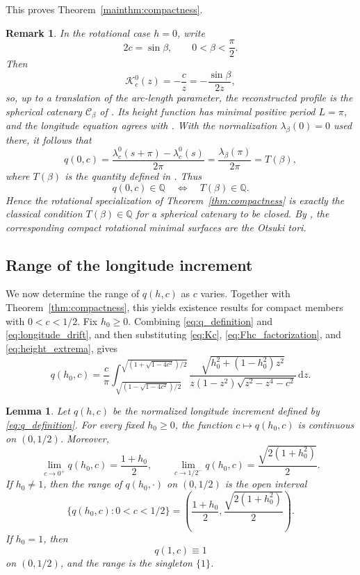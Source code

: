\documentclass[a4paper,11pt]{amsart}
\numberwithin{equation}{section}
\theoremstyle{plain}
\newtheorem{lem}[thm]{Lemma}
\newtheorem{rem}[thm]{Remark}
\newcommand{\dif}{\mathrm{d}}
\begin{document}
This proves Theorem~\ref{mainthm:compactness}.

\begin{rem}
In the rotational case $h=0$, write
\[
2c=\sin\beta,
\qquad
0<\beta<\frac{\pi}{2}.
\]
Then
\[
\mathcal K_c^0(z)=-\frac{c}{z}
=-\frac{\sin\beta}{2z},
\]
so, up to a translation of the arc-length parameter, the reconstructed
profile is the spherical catenary $\mathcal C_\beta$ of
\cite[Section~3.2]{Castro2024}. Its height function has minimal positive
period $L=\pi$, and the longitude equation agrees with
\cite[Eqs.~(3.12)--(3.14)]{Castro2024}. With the normalization
$\lambda_\beta(0)=0$ used there, it follows that
\[
q(0,c)
=
\frac{\lambda_c^0(s+\pi)-\lambda_c^0(s)}{2\pi}
=
\frac{\lambda_\beta(\pi)}{2\pi}
= T(\beta),
\]
where $T(\beta)$ is the quantity defined in
\cite[Eq.~(3.15)]{Castro2024}. Thus
\[
q(0,c)\in\mathbb Q
\quad\Longleftrightarrow\quad
T(\beta)\in\mathbb Q.
\]
Hence the rotational specialization of
Theorem~\ref{thm:compactness} is exactly the classical condition $T(\beta)\in\mathbb Q$ for a spherical catenary to be closed. By
\cite[Corollary~3.5 and Theorem~5.2]{Castro2024}, the corresponding compact
rotational minimal surfaces are the Otsuki tori. 
\end{rem}

\subsection{Range of the longitude increment}

We now determine the range of $q(h,c)$ as $c$ varies. Together with
Theorem~\ref{thm:compactness}, this yields existence results for compact
members with $0<c<1/2$. Fix $h_0\geq0$. Combining \eqref{eq:q_definition} and
\eqref{eq:longitude_drift}, and then substituting \eqref{eq:Kc},
\eqref{eq:Fhc_factorization}, and \eqref{eq:height_extrema}, gives
\begin{equation}\label{eq:q_explicit_integral}
q(h_0,c)
=
\frac{c}{\pi}
\int_{\sqrt{(1-\sqrt{1-4c^2})/2}}^{\sqrt{(1+\sqrt{1-4c^2})/2}}
\frac{\sqrt{h_0^2+(1-h_0^2)z^2}}
{z(1-z^2)\sqrt{z^2-z^4-c^2}}\,\dif z.
\end{equation}

\begin{lem}\label{lem:q_range}
Let $q(h,c)$ be the normalized longitude increment defined by
\eqref{eq:q_definition}. For every fixed $h_0\geq0$, the function
$c\mapsto q(h_0,c)$ is continuous on $(0,1/2)$. Moreover,
\begin{equation}\label{eq:q_endpoint_limits}
\lim_{c\to0^+}q(h_0,c)=\frac{1+h_0}{2},
\qquad
\lim_{c\to1/2^-}q(h_0,c)=\frac{\sqrt{2(1+h_0^2)}}{2}.
\end{equation}
If $h_0\neq1$, then the range of $q(h_0,\cdot)$ on $(0,1/2)$ is the open
interval
\begin{equation}\label{eq:q_range_interval}
\bigl\{q(h_0,c):0<c<1/2\bigr\}
=
\left(
\frac{1+h_0}{2},
\frac{\sqrt{2(1+h_0^2)}}{2}
\right).
\end{equation}
If $h_0=1$, then
\begin{equation}\label{eq:q_pitch_one}
q(1,c)\equiv1
\end{equation}
on $(0,1/2)$, and the range is the singleton $\{1\}$.
\end{lem}
\end{document}
